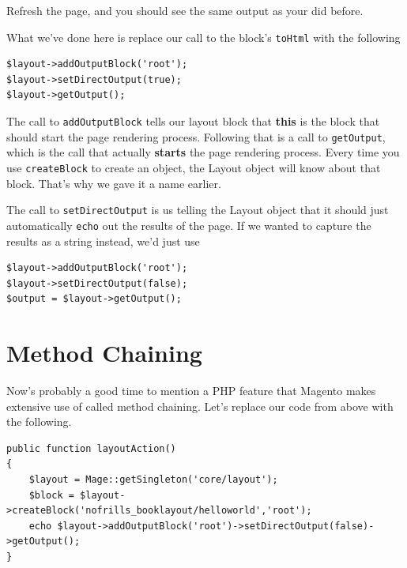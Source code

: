 \documentclass[oneside]{book}
\begin{document}
Refresh the page, and you should see the same output as your did before.  

What we've done here is replace our call to the block's \footnotesize\texttt{toHtml} \normalsize  with the following

\begin{lstlisting}
$layout->addOutputBlock('root');
$layout->setDirectOutput(true);
$layout->getOutput();

\end{lstlisting}


The call to \footnotesize\texttt{addOutputBlock} \normalsize  tells our layout block that \textbf{this} is the block that should start the page rendering process.  Following that is a call to \footnotesize\texttt{getOutput}\normalsize,  which is the call that actually \textbf{starts} the page rendering process.  Every time you use \footnotesize\texttt{createBlock} \normalsize  to create an object, the Layout object will know about that block.  That's why we gave it a name earlier.  

The call to \footnotesize\texttt{setDirectOutput} \normalsize  is us telling the Layout object that it should just automatically \footnotesize\texttt{echo} \normalsize  out the results of the page.   If we wanted to capture the results as a string instead, we'd just use

\begin{lstlisting}
$layout->addOutputBlock('root');
$layout->setDirectOutput(false);
$output = $layout->getOutput(); 

\end{lstlisting}


\section{Method Chaining}

Now's probably a good time to mention a PHP feature that Magento makes extensive use of called method chaining.  Let's replace our code from above with the following.

\begin{lstlisting}
public function layoutAction()
{
    $layout = Mage::getSingleton('core/layout');                
    $block = $layout->createBlock('nofrills_booklayout/helloworld','root');         
    echo $layout->addOutputBlock('root')->setDirectOutput(false)->getOutput();
}   

\end{lstlisting}
\end{document}
